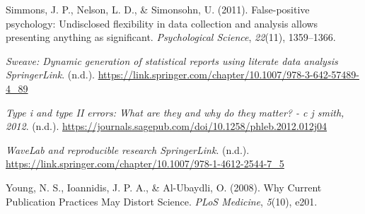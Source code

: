 \documentclass[
  a4paper,
]{article}
\newlength{\cslhangindent}
\newenvironment{CSLReferences}[2] %
 {\begin{list}{}{%
  \setlength{\itemindent}{0pt}
  \setlength{\leftmargin}{0pt}
  \setlength{\parsep}{0pt}
  \ifodd #1
   \setlength{\leftmargin}{\cslhangindent}
   \setlength{\itemindent}{-1\cslhangindent}
  \fi
  \setlength{\itemsep}{#2\baselineskip}}}
 {\end{list}}
\begin{document}
\begin{CSLReferences}{1}{0}
Simmons, J. P., Nelson, L. D., \& Simonsohn, U. (2011). False-positive
psychology: {Undisclosed} flexibility in data collection and analysis
allows presenting anything as significant. \emph{Psychological Science},
\emph{22}(11), 1359--1366.

\emph{Sweave: Dynamic generation of statistical reports using literate
data analysis \textbar{} SpringerLink}. (n.d.).
\url{https://link.springer.com/chapter/10.1007/978-3-642-57489-4_89}

\emph{Type i and type II errors: What are they and why do they matter? -
c j smith, 2012}. (n.d.).
\url{https://journals.sagepub.com/doi/10.1258/phleb.2012.012j04}

\emph{WaveLab and reproducible research \textbar{} SpringerLink}.
(n.d.).
\url{https://link.springer.com/chapter/10.1007/978-1-4612-2544-7_5}

Young, N. S., Ioannidis, J. P. A., \& Al-Ubaydli, O. (2008). Why
{Current Publication Practices May Distort Science}. \emph{PLoS
Medicine}, \emph{5}(10), e201.

\end{CSLReferences}
\end{document}
